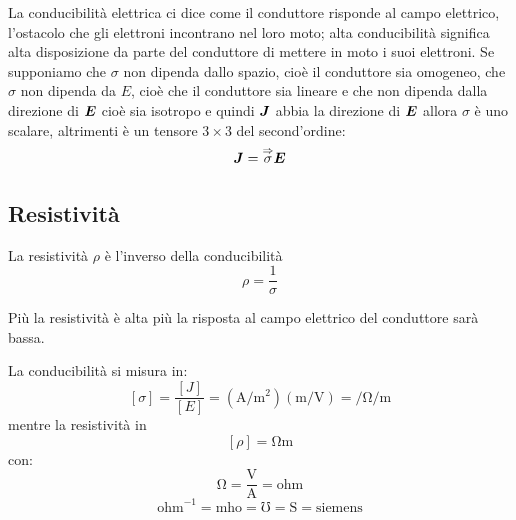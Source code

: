 La conducibilità elettrica ci dice come il conduttore risponde al campo elettrico, l'ostacolo che gli elettroni incontrano nel loro moto; alta conducibilità significa alta disposizione da parte del conduttore di mettere in moto i suoi elettroni. Se supponiamo che $\sigma$ non dipenda dallo spazio, cioè il conduttore sia omogeneo, che $\sigma$ non dipenda da $E$, cioè che il conduttore sia lineare e che non dipenda dalla direzione di $\boldsymbol{E}$ cioè sia isotropo e quindi $\boldsymbol{J}$ abbia la direzione di $\boldsymbol{E}$ allora $\sigma$ è uno scalare, altrimenti è un tensore $3\times 3$ del second'ordine:
\[\boldsymbol{J}=\overset{\Rightarrow}{\sigma}\boldsymbol{E}\]
\subsection{Resistività }
\begin{Def}
  La resistività $\rho$ è l'inverso della conducibilità
  \[\rho=\frac{1}{\sigma}\]
\end{Def}
Più la resistività è alta più la risposta al campo elettrico del conduttore sarà bassa.

La conducibilità si misura in:
\[[\sigma]=\frac{[J]}{[E]}=(\si{\ampere\per\metre\squared})(\si{\meter\per\volt})=\si{\per\ohm\per\metre}\]
mentre la resistività in
\[[\rho]=\si{\ohm\meter}\]
con:
\[\si{\ohm}=\frac{\si{\volt}}{\si{\ampere}}=\text{ohm}\]
\[\text{ohm}^{-1}=\text{mho}=\si{\mho}=\si{\siemens}=\text{siemens}\]
